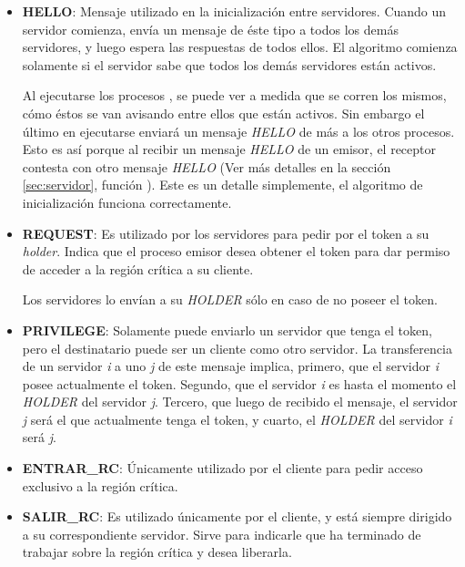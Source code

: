 \begin{itemize}

\item \textbf{HELLO}: Mensaje utilizado en la inicialización entre servidores.
Cuando un servidor comienza, envía un mensaje de éste tipo a todos los demás
servidores, y luego espera las respuestas de todos ellos. El algoritmo comienza
solamente si el servidor sabe que todos los demás servidores están activos.

Al ejecutarse los procesos , se puede ver a medida que se
corren los mismos, cómo éstos se van avisando entre ellos que están activos.
Sin embargo el último en ejecutarse enviará un mensaje \emph{HELLO} de más a
los otros procesos. Esto es así porque al recibir un mensaje \emph{HELLO} de un
emisor, el receptor contesta con otro mensaje \emph{HELLO} (Ver más detalles en
la sección \ref{sec:servidor}, función ). Este es un
detalle simplemente, el algoritmo de inicialización funciona correctamente.

\item \textbf{REQUEST}: Es utilizado por los servidores para pedir por el token
a su \emph{holder}. Indica que el proceso  emisor desea obtener
el token para dar permiso de acceder a la región crítica a su cliente.

Los servidores lo envían a su \emph{HOLDER} sólo en caso de no poseer el token.

\item \textbf{PRIVILEGE}: Solamente puede enviarlo un servidor que tenga el
token, pero el destinatario puede ser un cliente como otro servidor. La
transferencia de un servidor \textsl{i} a uno \textsl{j} de este mensaje
implica, primero, que el servidor \textsl{i} posee actualmente el token.
Segundo, que el servidor \textsl{i} es hasta el momento el \emph{HOLDER} del
servidor \textsl{j}. Tercero, que luego de recibido el mensaje, el servidor
\textsl{j} será el que actualmente tenga el token, y cuarto, el \emph{HOLDER}
del servidor \textsl{i} será \textsl{j}.

\item \textbf{ENTRAR\_RC}: Únicamente utilizado por el cliente para pedir
acceso exclusivo a la región crítica.

\item \textbf{SALIR\_RC}: Es utilizado únicamente por el cliente, y está
siempre dirigido a su correspondiente servidor. Sirve para indicarle que ha
terminado de trabajar sobre la región crítica y desea liberarla.

\end{itemize}

